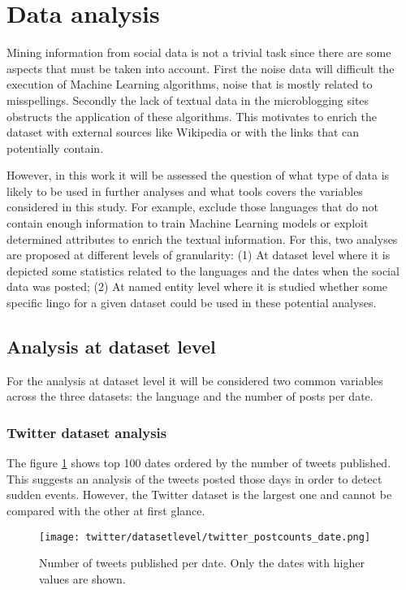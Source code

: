 \section{Data analysis}

Mining information from social data is not a trivial task since there are some aspects that must be taken into account. First the noise data will difficult the execution of Machine Learning algorithms, noise that is mostly related to misspellings. Secondly the lack of textual data in the microblogging sites obstructs the application of these algorithms. This motivates to enrich the dataset with external sources like Wikipedia \citep{wikiEnrichTwitter} or with the links that can potentially contain.
\par However, in this work it will be assessed the question of what type of data is likely to be used in further analyses and what tools covers the variables considered in this study. For example, exclude those languages that do not contain enough information to train Machine Learning models or exploit determined attributes to enrich the textual information. For this, two analyses are proposed at different levels of granularity: (1) At dataset level where it is depicted some statistics related to the languages and the dates when the social data was posted; (2) At named entity level where it is studied whether some specific lingo for a given dataset could be used in these potential analyses.


\subsection{Analysis at dataset level}
For the analysis at dataset level it will be considered two common variables across the three datasets: the language and the number of posts per date.
\subsubsection{Twitter dataset analysis}
The figure \ref{fig:twitter_postcounts_date} shows top 100 dates ordered by the number of tweets published. This suggests an analysis of the tweets posted those days in order to detect sudden events.
However, the Twitter dataset is the largest one and cannot be compared with the other at first glance.
\begin{figure}[H]
	\begin{center}
		\texttt{[image: twitter/datasetlevel/twitter\_postcounts\_date.png]}
		\caption{Number of tweets published per date. Only the dates with higher values are shown.}
		\label{fig:twitter_postcounts_date}
	\end{center}
\end{figure}

